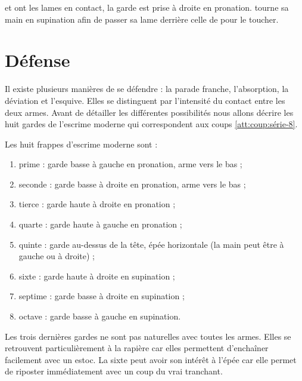 \begin{technique}
\label{struct:tech:changement-ligne}

\A et \D ont les lames en contact, la garde est prise à droite en pronation.
\A tourne sa main en supination afin de passer sa lame derrière celle de \D pour le toucher.

\end{technique}


\section{Défense}



Il existe plusieurs manières de se défendre : la parade franche, l'absorption, la déviation et l'esquive.
Elles se distinguent par l'intensité du contact entre les deux armes.
Avant de détailler les différentes possibilités nous allons décrire les huit gardes de l'escrime moderne qui correspondent aux coups \ref{att:coup:série-8}.


\begin{garde}
\label{att:garde:escrime-moderne}

\noindent
Les huit frappes d'escrime moderne sont :
\begin{enumerate}
	\item prime : garde basse à gauche en pronation, arme vers le bas ;
	\item seconde : garde basse à droite en pronation, arme vers le bas ;
	\item tierce : garde haute à droite en pronation ;
	\item quarte : garde haute à gauche en pronation ;
	\item quinte : garde au-dessus de la tête, épée horizontale (la main peut être à gauche ou à droite) ;
	\item sixte : garde haute à droite en supination ;
	\item septime : garde basse à droite en supination ;
	\item octave : garde basse à gauche en supination.
\end{enumerate}
\end{garde}


Les trois dernières gardes ne sont pas naturelles avec toutes les armes.
Elles se retrouvent particulièrement à la rapière car elles permettent d'enchaîner facilement avec un estoc.
La sixte peut avoir son intérêt à l'épée car elle permet de riposter immédiatement avec un coup du vrai tranchant.


